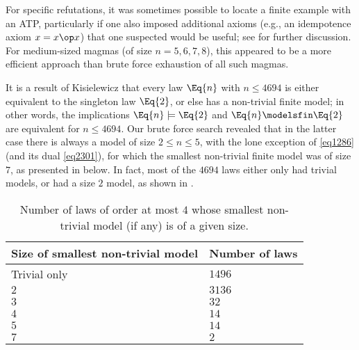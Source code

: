 For specific refutations, it was sometimes possible to locate a finite example with an ATP, particularly if one also imposed additional axioms (e.g., an idempotence axiom $x = x \op x$) that one suspected would be useful; see  for further discussion.  For medium-sized magmas (of size $n=5,6,7,8$), this appeared to be a more efficient approach than brute force exhaustion of all such magmas.

It is a result of Kisielewicz \cite{Kisielewicz} that every law $\Eq{n}$ with $n \leq 4694$ is either equivalent to the singleton law $\Eq{2}$, or else has a non-trivial finite model; in other words, the implications $\Eq{n} \models \Eq{2}$ and $\Eq{n} \modelsfin \Eq{2}$ are equivalent for $n \leq 4694$.  Our brute force search revealed that in the latter case there is always a model of size $2 \leq n \leq 5$, with the lone exception of \eqref{eq1286} (and its dual \eqref{eq2301}), for which the smallest non-trivial finite model was of size $7$, as presented in  below.  In fact, most of the $\num{4694}$ laws either only had trivial models, or had a size $2$ model, as shown in .
\begin{table}
\centering
\caption{Number of laws of order at most $4$ whose smallest non-trivial model (if any) is of a given size.}\label{size-table}
\begin{tabular}{ll}
  \hline
Size of smallest non-trivial model & Number of laws \\
\hline
Trivial only & $1496$ \\
$2$ & $3136$ \\
$3$ & $32$ \\
$4$ & $14$ \\
$5$ & $14$ \\
$7$ & $2$\\
\hline
\end{tabular}
\end{table}


